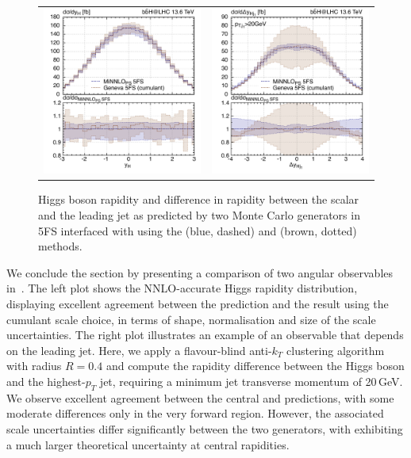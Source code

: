 \documentclass[11pt,a4paper]{article}
\begin{document}
\begin{figure}[t!]
\begin{center}
\begin{tabular}{cc}
\includegraphics[width=.45\textwidth, page=1]{plots/5fs/genevaminnlo/minnloKQvar-geneva-yh.pdf}&
\includegraphics[width=.45\textwidth, page=1]{plots/5fs/genevaminnlo/minnloKQvar-geneva-dyhj.pdf}
\end{tabular}
\vspace*{1ex}
\caption{Higgs boson rapidity and difference in rapidity between the scalar and the leading jet as predicted by two Monte Carlo generators in 5FS interfaced with  using the \minnlo{} (blue, dashed) and \GENEVA{} (brown, dotted) methods. \label{fig:genevay}}
\end{center}
\end{figure}

We conclude the section by presenting a comparison of two angular observables in~. The left plot shows the NNLO-accurate Higgs rapidity distribution, displaying excellent agreement between the \minnlo{} prediction and the \GENEVA{} result using the cumulant scale choice, in terms of shape, normalisation and size of the scale uncertainties. 
The right plot illustrates an example of an observable that depends on the leading jet. Here, we apply a flavour-blind anti-$k_T$ clustering algorithm with radius $R = 0.4$ and compute the rapidity difference between the Higgs boson and the highest-$p_T$ jet, requiring a minimum jet transverse momentum of 20\,GeV. We observe excellent agreement between the central \minnlo{} and 
\GENEVA{} predictions, with some moderate differences only in the very forward region. However, the associated scale uncertainties differ significantly between the two generators, with \GENEVA{} exhibiting a much larger theoretical uncertainty at central
rapidities.
\end{document}
